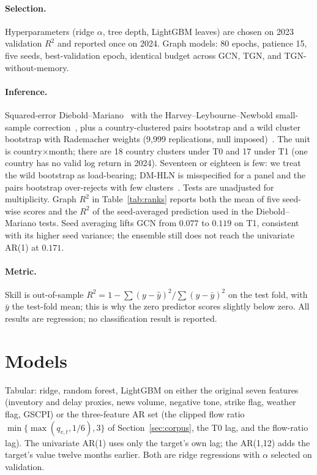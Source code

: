 \documentclass[10pt]{article}
\begin{document}
\paragraph{Selection.}
Hyperparameters (ridge $\alpha$, tree depth, LightGBM leaves) are chosen on 2023 validation $R^2$ and reported once on 2024. Graph models: 80 epochs, patience 15, five seeds, best-validation epoch, identical budget across GCN, TGN, and TGN-without-memory.

\paragraph{Inference.}
Squared-error Diebold--Mariano~\citep{ref28} with the Harvey--Leybourne--Newbold small-sample correction~\citep{ref33}, plus a country-clustered pairs bootstrap and a wild cluster bootstrap with Rademacher weights (9{,}999 replications, null imposed)~\citep{ref34}. The unit is country$\times$month; there are 18 country clusters under T0 and 17 under T1 (one country has no valid log return in 2024). Seventeen or eighteen is few: we treat the wild bootstrap as load-bearing; DM-HLN is misspecified for a panel and the pairs bootstrap over-rejects with few clusters~\citep{ref34}. Tests are unadjusted for multiplicity. Graph $R^2$ in Table~\ref{tab:ranks} reports both the mean of five seed-wise scores and the $R^2$ of the seed-averaged prediction used in the Diebold--Mariano tests. Seed averaging lifts GCN from $0.077$ to $0.119$ on T1, consistent with its higher seed variance; the ensemble still does not reach the univariate AR(1) at $0.171$.

\paragraph{Metric.}
Skill is out-of-sample $R^2=1-\sum(y-\hat y)^2/\sum(y-\bar y)^2$ on the test fold, with $\bar y$ the test-fold mean; this is why the zero predictor scores slightly below zero. All results are regression; no classification result is reported.

\section{Models}
\label{sec:models}

Tabular: ridge, random forest, LightGBM on either the original seven features (inventory and delay proxies, news volume, negative tone, strike flag, weather flag, GSCPI) or the three-feature AR set (the clipped flow ratio $\min\{\max(q_{v,t},1/6),3\}$ of Section~\ref{sec:corpus}, the T0 lag, and the flow-ratio lag). The univariate AR(1) uses only the target's own lag; the AR(1,12) adds the target's value twelve months earlier. Both are ridge regressions with $\alpha$ selected on validation.
\end{document}
